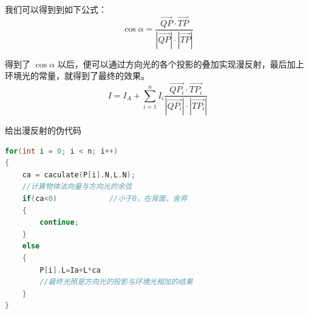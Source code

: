 \documentclass[12pt,oneside,a4paper]{ctexart}
\begin{document}
我们可以得到到如下公式：
\begin{equation*}
	\cos{\alpha} = \frac{\vec{QP} \cdot \vec{TP}}{\left\lvert \vec{QP} \right\rvert \cdot \left\lvert \vec{TP} \right\rvert }
\end{equation*}

得到了 $\cos{\alpha}$ 以后，便可以通过方向光的各个投影的叠加实现漫反射，最后加上环境光的常量，就得到了最终的效果。
\begin{equation*}
	I=I_{A}+\sum_{i = 1}^{n}I_{i}   \frac{\vec{QP_{i}} \cdot \vec{TP_{i}}}{\left\lvert \vec{QP_{i}} \right\rvert \cdot \left\lvert \vec{TP_{i}} \right\rvert }
\end{equation*}

给出漫反射的伪代码
\begin{lstlisting}[language=c++]
for(int i = 0; i < n; i++)
{
	ca = caculate(P[i].N,L.N);
	//计算物体法向量与方向光的余弦
	if(ca<0)			//小于0，在背面，舍弃
	{
		continue;
	}
	else
	{
		P[i].L=Ia+L*ca
		//最终光照是方向光的投影与环境光相加的结果
	}
}
\end{lstlisting}
\end{document}
